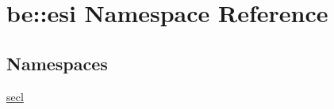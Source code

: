 \hypertarget{namespacebe_1_1esi}{}\section{be\+:\+:esi Namespace Reference}
\label{namespacebe_1_1esi}
\subsection*{Namespaces}
\begin{DoxyCompactItemize}
\item 
 \hyperlink{namespacebe_1_1esi_1_1secl}{secl}
\end{DoxyCompactItemize}
